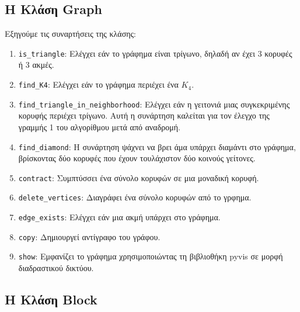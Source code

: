 \subsection{H Kλάση Graph}





Εξηγούμε τις συναρτήσεις της κλάσης:

\begin{enumerate}
	\item \texttt{is\_triangle}: Ελέγχει εάν το γράφημα είναι τρίγωνο, δηλαδή αν έχει 3 κορυφές ή 3 ακμές.
	
	\item \texttt{find\_K4}: Ελέγχει εάν το γράφημα περιέχει ένα $K_4$.
	
	\item \texttt{find\_triangle\_in\_neighborhood}: Ελέγχει εάν η γειτονιά μιας συγκεκριμένης κορυφής περιέχει τρίγωνο. Αυτή η συνάρτηση καλείται για τον έλεγχο της γραμμής 1 του αλγορίθμου μετά από αναδρομή. 
	
	\item \texttt{find\_diamond}: Η συνάρτηση ψάχνει να βρει άμα υπάρχει διαμάντι στο γράφημα, βρίσκοντας δύο κορυφές που έχουν τουλάχιστον δύο κοινούς γείτονες.
	
	\item \texttt{contract}: Συμπτύσσει ένα σύνολο κορυφών σε μια μοναδική κορυφή.
	
	\item \texttt{delete\_vertices}: Διαγράφει ένα σύνολο κορυφών από το γρφημα.
	
	\item \texttt{edge\_exists}: Ελέγχει εάν μια ακμή υπάρχει στο γράφημα.
	
	\item \texttt{copy}: Δημιουργεί αντίγραφο του γράφου.
	
	\item \texttt{show}: Εμφανίζει το γράφημα χρησιμοποιώντας τη βιβλιοθήκη pyvis σε μορφή διαδραστικού δικτύου.
\end{enumerate}


\subsection{H Kλάση Block}

